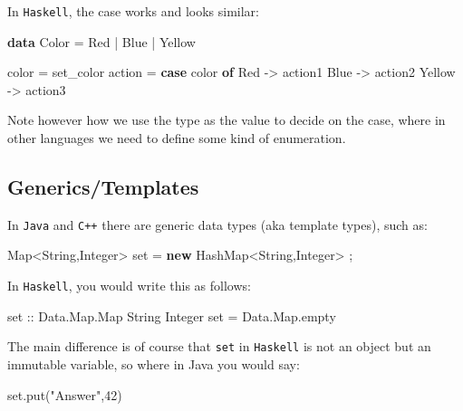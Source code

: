 \documentclass[11pt]{amsart}
\newenvironment{Shaded}{}{}
\newcommand{\KeywordTok}[1]{\textcolor[rgb]{0.00,0.44,0.13}{\textbf{{#1}}}}
\newcommand{\DataTypeTok}[1]{\textcolor[rgb]{0.56,0.13,0.00}{{#1}}}
\newcommand{\DecValTok}[1]{\textcolor[rgb]{0.25,0.63,0.44}{{#1}}}
\newcommand{\StringTok}[1]{\textcolor[rgb]{0.25,0.44,0.63}{{#1}}}
\newcommand{\OtherTok}[1]{\textcolor[rgb]{0.00,0.44,0.13}{{#1}}}
\newcommand{\FunctionTok}[1]{\textcolor[rgb]{0.02,0.16,0.49}{{#1}}}
\newcommand{\NormalTok}[1]{{#1}}
\begin{document}
In \texttt{Haskell}, the case works and looks similar:

\begin{Shaded}
\begin{Highlighting}[]
    \KeywordTok{data} \DataTypeTok{Color} \FunctionTok{=} \DataTypeTok{Red} \FunctionTok{|} \DataTypeTok{Blue} \FunctionTok{|} \DataTypeTok{Yellow}

    \NormalTok{color }\FunctionTok{=} \NormalTok{set_color}
    \NormalTok{action }\FunctionTok{=} \KeywordTok{case} \NormalTok{color }\KeywordTok{of}
        \DataTypeTok{Red} \OtherTok{->} \NormalTok{action1}
        \DataTypeTok{Blue} \OtherTok{->} \NormalTok{action2}
        \DataTypeTok{Yellow} \OtherTok{->} \NormalTok{action3}
\end{Highlighting}
\end{Shaded}

Note however how we use the type as the value to decide on the case,
where in other languages we need to define some kind of enumeration.

\subsection{Generics/Templates}\label{genericstemplates}

In \texttt{Java} and \texttt{C++} there are generic data types (aka
template types), such as:

\begin{Shaded}
\begin{Highlighting}[]
    \NormalTok{Map<String,Integer> set = }\KeywordTok{new} \NormalTok{HashMap<String,Integer> ;}
\end{Highlighting}
\end{Shaded}

In \texttt{Haskell}, you would write this as follows:

\begin{Shaded}
\begin{Highlighting}[]
\OtherTok{    set ::} \DataTypeTok{Data.Map.Map} \DataTypeTok{String} \DataTypeTok{Integer} 
    \NormalTok{set }\FunctionTok{=} \NormalTok{Data.Map.empty}
\end{Highlighting}
\end{Shaded}

The main difference is of course that \texttt{set} in \texttt{Haskell}
is not an object but an immutable variable, so where in Java you would
say:

\begin{Shaded}
\begin{Highlighting}[]
    \NormalTok{set.}\FunctionTok{put}\NormalTok{(}\StringTok{"Answer"}\NormalTok{,}\DecValTok{42}\NormalTok{)}
\end{Highlighting}
\end{Shaded}
\end{document}
